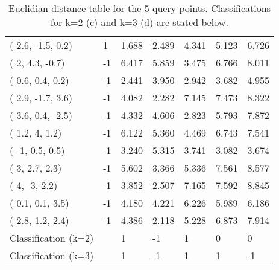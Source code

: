 \documentclass[12pt]{article}
\begin{document}
\begin{table}[h!]
\begin{tabular}{lllllll}
( 2.6, -1.5, 0.2)    & 1     & \cellcolor[HTML]{FFFE65}1.688 & \cellcolor[HTML]{FFCC67}2.489 & 4.341                         & 5.123                         & 6.726                         \\
( 2, 4.3, -0.7)      & -1    & 6.417                         & 5.859                         & 3.475                         & 6.766                         & 8.011                         \\
( 0.6, 0.4, 0.2)     & -1    & 2.441                         & 3.950                         & 2.942                         & 3.682                         & 4.955                         \\
( 2.9, -1.7, 3.6)    & -1    & 4.082                         & \cellcolor[HTML]{FFFE65}2.282 & 7.145                         & 7.473                         & 8.322                         \\
( 3.6, 0.4, -2.5)    & -1    & 4.332                         & 4.606                         & \cellcolor[HTML]{FFCC67}2.823 & 5.793                         & 7.872                         \\
( 1.2, 4, 1.2)       & -1    & 6.122                         & 5.360                         & 4.469                         & 6.743                         & 7.541                         \\
( -1, 0.5, 0.5)      & -1    & 3.240                         & 5.315                         & 3.741                         & 3.082                         & 3.674                         \\
( 3, 2.7, 2.3)       & -1    & 5.602                         & 3.366                         & 5.336                         & 7.561                         & 8.577                         \\
( 4, -3, 2.2)        & -1    & 3.852                         & 2.507                         & 7.165                         & 7.592                         & 8.845                         \\
( 0.1, 0.1, 3.5)     & -1    & 4.180                         & 4.221                         & 6.226                         & 5.989                         & 6.186                         \\
( 2.8, 1.2, 2.4)     & -1    & 4.386                         & \cellcolor[HTML]{FFFE65}2.118 & 5.228                         & 6.873                         & 7.914                         \\ \hline
Classification (k=2) &       & 1                             & -1                            & 1                             & 0                             & 0                             \\
Classification (k=3) &       & 1                             & -1                            & 1                             & 1                             & -1                           \\ \hline
\end{tabular}
\caption{Euclidian distance table for the 5 query points. Classifications for k=2 (c) and k=3 (d) are stated below.}
\end{table}
\end{document}

